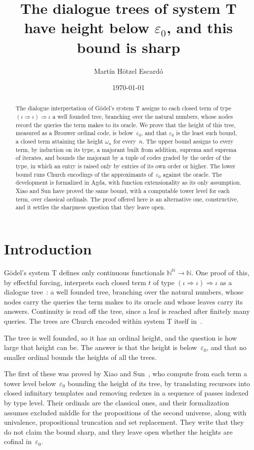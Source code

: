 \documentclass[11pt]{amsart}
\title[Dialogue trees of system T]{The dialogue trees of system T have
  height below $\varepsilon_0$, and this bound is sharp}
\author{Mart\'in H\"otzel Escard\'o}
\date{\today}
\newcommand{\N}{\mathbb{N}}
\newcommand{\Baire}{\N^{\N}}
\newcommand{\gr}{\iota}                      %
\newcommand{\arr}{\Rightarrow}
\newcommand{\eps}{\varepsilon_{0}}
\newcommand{\tower}[1]{\omega_{#1}}           %
\theoremstyle{plain}
\theoremstyle{definition}
\begin{document}
\begin{abstract}
  The dialogue interpretation of G\"odel's system T assigns to each
  closed term of type $(\gr\arr\gr)\arr\gr$ a well founded tree,
  branching over the natural numbers, whose nodes record the queries
  the term makes to its oracle. We prove that the height of this tree,
  measured as a Brouwer ordinal code, is below~$\eps$, and that
  $\eps$ is the least such bound, a closed term attaining the height
  $\tower n$ for every~$n$. The upper bound assigns to every term,
  by induction on its type, a majorant built from addition, suprema
  and suprema of iterates, and bounds the majorant by a tuple of codes
  graded by the order of the type, in which an entry is raised only by
  entries of its own order or higher. The lower bound runs Church
  encodings of the approximants of~$\eps$ against the oracle. The
  development is formalized in Agda, with function extensionality as
  its only assumption. Xiao and Sun have proved the same bound, with
  a computable tower level for each term, over classical ordinals.
  The proof offered here is an alternative one, constructive, and it
  settles the sharpness question that they leave open.
\end{abstract}

\maketitle

\section{Introduction}
\label{sec:intro}

G\"odel's system T defines only continuous functionals
$\Baire\to\N$. One proof of this, by effectful forcing, interprets
each closed term $t$ of type $(\gr\arr\gr)\arr\gr$ as a dialogue
tree~\cite{Escardo2013}: a well founded tree, branching over the
natural numbers, whose nodes carry the queries the term makes to its
oracle and whose leaves carry its answers. Continuity is read off the
tree, since a leaf is reached after finitely many queries. The trees
are Church encoded within system T itself
in~\cite{EscardoPaivaRahliTosun2025}.

The tree is well founded, so it has an ordinal height, and the
question is how large that height can be. The answer is that the
height is below~$\eps$, and that no smaller ordinal bounds the heights
of all the trees.

The first of these was proved by Xiao and Sun~\cite{XiaoSun2026}, who
compute from each term a tower level below~$\eps$ bounding the height
of its tree, by translating recursors into closed infinitary templates
and removing redexes in a sequence of passes indexed by type level.
Their ordinals are the classical ones, and their formalization assumes
excluded middle for the propositions of the second universe, along
with univalence, propositional truncation and set replacement. They
write that they do not claim the bound sharp, and they leave open
whether the heights are cofinal in~$\eps$.
\end{document}
